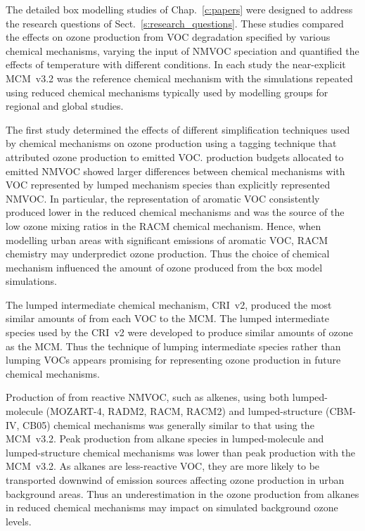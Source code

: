 The detailed box modelling studies of Chap.~\ref{c:papers} were designed to address the research questions of Sect.~\ref{s:research_questions}.
These studies compared the effects on ozone production from VOC degradation specified by various chemical mechanisms, varying the input of NMVOC speciation and quantified the effects of temperature with different  conditions.
In each study the near-explicit MCM~v3.2 was the reference chemical mechanism with the simulations repeated using reduced chemical mechanisms typically used by modelling groups for regional and global studies.

The first study determined the effects of different simplification techniques used by chemical mechanisms on ozone production using a tagging technique that attributed ozone production to emitted VOC.
 production budgets allocated to emitted NMVOC showed larger differences between chemical mechanisms with VOC represented by lumped mechanism species than explicitly represented NMVOC.
In particular, the representation of aromatic VOC consistently produced lower  in the reduced chemical mechanisms and was the source of the low ozone mixing ratios in the RACM chemical mechanism.
Hence, when modelling urban areas with significant emissions of aromatic VOC, RACM chemistry may underpredict ozone production.
Thus the choice of chemical mechanism influenced the amount of ozone produced from the box model simulations.

The lumped intermediate chemical mechanism, CRI~v2, produced the most similar amounts of  from each VOC to the MCM.
The lumped intermediate species used by the CRI~v2 were developed to produce similar amounts of ozone as the MCM.
Thus the technique of lumping intermediate species rather than lumping VOCs appears promising for representing ozone production in future chemical mechanisms.

Production of  from reactive NMVOC, such as alkenes, using both lumped-molecule (MOZART-4, RADM2, RACM, RACM2) and lumped-structure (CBM-IV, CB05) chemical mechanisms was generally similar to that using the MCM~v3.2.
Peak  production from alkane species in lumped-molecule and lumped-structure chemical mechanisms was lower than peak  production with the MCM~v3.2.
As alkanes are less-reactive VOC, they are more likely to be transported downwind of emission sources affecting ozone production in urban background areas.
Thus an underestimation in the ozone production from alkanes in reduced chemical mechanisms may impact on simulated background ozone levels.

